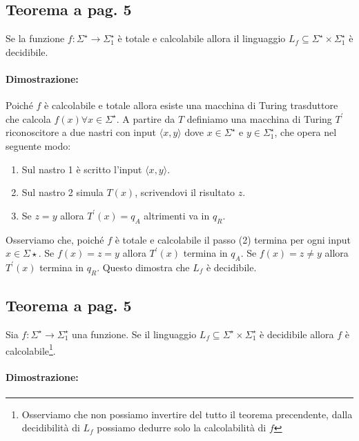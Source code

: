 \subsection{Teorema a pag. 5}

Se la funzione $f: \Sigma^{\star}\rightarrow\Sigma^{\star}_{1}$ è totale e calcolabile allora il linguaggio $L_{f}\subseteq\Sigma^{\star} \times \Sigma^{\star}_{1}$ è decidibile.

\paragraph*{Dimostrazione:}
Poiché $f$ è calcolabile e totale allora esiste una macchina di Turing trasduttore che calcola $f(x) \forall x\in \Sigma^{\star}$. A partire da $T$
definiamo una macchina di Turing $T^{'}$ riconoscitore a due nastri con input $\langle x, y \rangle$ dove $x\in \Sigma^{\star}$ e $y\in \Sigma^{\star}_{1}$, che opera nel seguente modo:
\begin{enumerate}
    \item Sul nastro 1 è scritto l'input $\langle x, y \rangle$.
    \item Sul nastro 2 simula $T(x)$, scrivendovi il risultato $z$.
    \item Se $z = y$ allora $T^{'}(x) = q_{A}$ altrimenti va in $q_{R}$. 
\end{enumerate}
Osserviamo che, poiché $f$ è totale e calcolabile il passo (2) termina per ogni input $x\in \Sigma{\star}$. Se $f(x) = z = y$ allora $T^{'}(x)$ termina in $q_{A}$.
Se $f(x) = z \neq y$ allora $T^{'}(x)$ termina in $q_{R}$. Questo dimostra che $L_{f}$ è decidibile.

\subsection{Teorema a pag. 5}

Sia $f: \Sigma^{\star}\rightarrow\Sigma^{\star}_{1}$ una funzione. Se il linguaggio $L_{f}\subseteq\Sigma^{\star} \times \Sigma^{\star}_{1}$ è decidibile allora $f$ è calcolabile\footnote{Osserviamo che non possiamo invertire del tutto il teorema precendente, dalla decidibilità di $L_{f}$ possiamo dedurre solo la calcolabilità di $f$}.

\paragraph*{Dimostrazione:}

